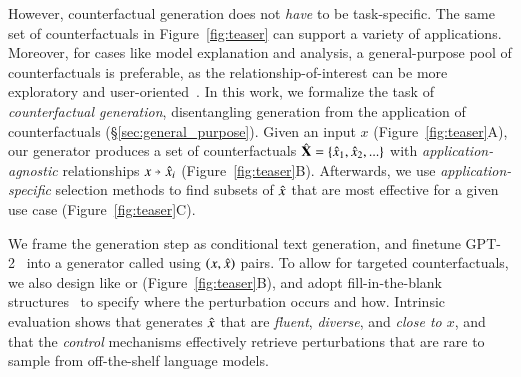 % 
However, counterfactual generation does not \emph{have} to be task-specific.
The same set of counterfactuals in Figure~\ref{fig:teaser} can support a variety of applications.
Moreover, for cases like model explanation and analysis, a general-purpose pool of counterfactuals is preferable, as the relationship-of-interest can be more exploratory and user-oriented~\cite{wu2019errudite}.
In this work, we formalize the task of \emph{counterfactual generation}, disentangling generation from the application of counterfactuals (\S\ref{sec:general_purpose}).
Given an input $x$ (Figure~\ref{fig:teaser}A), our generator produces a set of counterfactuals $\hat{\mathbf{X}} = \{\hat{x}_1, \hat{x}_2, ...\}$ with \emph{application-agnostic} relationships $x \veryshortarrow \xp_i$ (Figure~\ref{fig:teaser}B).
Afterwards, we use \emph{application-specific} selection methods to find subsets of $\hat{x}$ that are most effective for a given use case (Figure~\ref{fig:teaser}C).

We frame the generation step as conditional text generation, and finetune GPT-2~\cite{radford2019language} into a generator called \emph{\sysname} using $(x, \hat{x})$ pairs. 
To allow for targeted counterfactuals, we also design \tagstrs like  or  (Figure~\ref{fig:teaser}B), and adopt fill-in-the-blank structures~\cite{donahue2020enabling} to specify where the perturbation occurs and how.
Intrinsic evaluation shows that \sysname generates $\hat{x}$ that are \emph{fluent}, \emph{diverse}, and \emph{close to $x$}, and that the \emph{control} mechanisms effectively retrieve perturbations that are rare to sample from off-the-shelf language models. %


